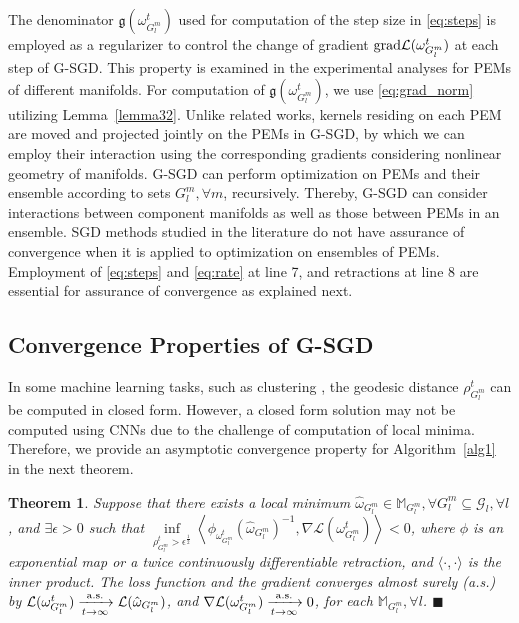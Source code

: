 \documentclass[10pt,journal,compsoc]{IEEEtran}
\newcommand{\gr}{{\rm grad}}
\newtheorem{theorem}{Theorem}[section]
\theoremstyle{definition}
\theoremstyle{definition}
\theoremstyle{remark}
\theoremstyle{remark}
\theoremstyle{remark}
\newcommand*{\QEDbs}{\hfill\ensuremath{\blacksquare}}%
\begin{document}



The denominator  $\mathfrak{g}(\omega_{G^m_l}^t)$ used for computation of the step size in \eqref{eq:steps} is employed as a regularizer to control the change of gradient $\gr \mathcal{L}(\omega_{G^m_l}^{t})$ at each step of G-SGD. This property is examined in the experimental analyses for PEMs of different manifolds. For computation of $\mathfrak{g}(\omega_{G^m_l}^t)$, we use \eqref{eq:grad_norm} utilizing Lemma~\ref{lemma32}. Unlike related works, kernels residing on each PEM are moved and projected jointly on the PEMs in G-SGD, by which we can employ their interaction using the corresponding gradients considering nonlinear geometry of manifolds. G-SGD can perform optimization on PEMs and their ensemble according to sets $G^m_l, \forall m$, recursively. Thereby, G-SGD can consider interactions between component manifolds as well as those between PEMs in an ensemble. SGD methods studied in the literature do not have assurance of convergence when it is applied to optimization on ensembles of PEMs. Employment of \eqref{eq:steps} and \eqref{eq:rate} at line 7, and retractions at line 8 are essential for assurance of convergence as explained next. 
\subsection{Convergence Properties of G-SGD}
In some machine learning tasks, such as clustering \cite{sgdman,zhangSra16a}, the geodesic distance $\rho_{G^m_l}^{t}$ can be computed in closed form. However, a closed form solution may not be computed using CNNs due to the challenge of computation of local minima. Therefore, we provide an asymptotic convergence property for Algorithm~\ref{alg1} in the next theorem.   


 
 \begin{theorem}
 	\label{thm33}
 	Suppose that there exists a local minimum $\hat{\omega}_{G^m_l} \in \mathbb{M}_{G^m_l}, \forall G^m_l \subseteq \mathcal{G}_l, \forall l$, and $\exists \epsilon>0$ such that $\inf \limits _{\rho_{G^m_l}^{t} > \epsilon^{\frac{1}{2}}} \left\langle \phi_{\omega_{G^m_l}^t}(\hat{\omega}_{G^m_l})^{-1}, \nabla \mathcal{L}(\omega_{G^m_l}^t) \right\rangle <0$, where $\phi$ is an exponential map or a twice continuously differentiable retraction, and $\langle \cdot,\cdot \rangle$ is the inner product. The loss function and the gradient converges almost surely (a.s.) by $\mathcal{L}(\omega^t_{G^m_l}) \xrightarrow[t \to \infty]{\rm a.s.} \mathcal{L}(\hat{\omega}_{G^m_l})$, and $\nabla \mathcal{L}(\omega^t_{G^m_l}) \xrightarrow[t \to \infty]{\rm a.s.} 0$, for each $\mathbb{M}_{G^m_l}, \forall l$. \QEDbs
 	
  \end{theorem}
\end{document}
